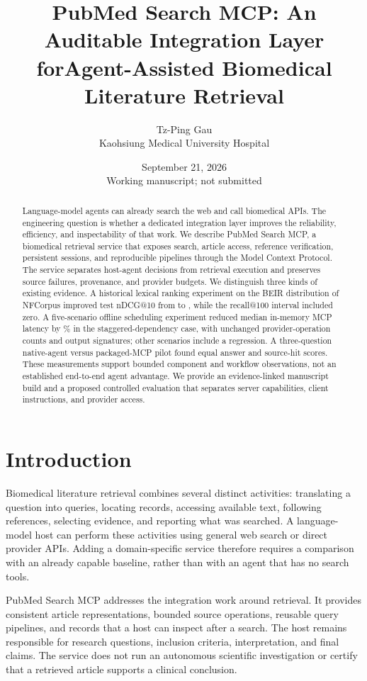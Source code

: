 \documentclass[11pt]{article}
\title{PubMed Search MCP: An Auditable Integration Layer for\newline Agent-Assisted Biomedical Literature Retrieval}
\author{Tz-Ping Gau\\Kaohsiung Medical University Hospital}
\date{September 21, 2026\\\small Working manuscript; not submitted}
\begin{document}
\maketitle
\begin{abstract}
Language-model agents can already search the web and call biomedical APIs. The
engineering question is whether a dedicated integration layer improves the
reliability, efficiency, and inspectability of that work. We describe PubMed
Search MCP, a biomedical retrieval service that exposes search, article access,
reference verification, persistent sessions, and reproducible pipelines through
the Model Context Protocol. The service separates host-agent decisions from
retrieval execution and preserves source failures, provenance, and provider
budgets. We distinguish three kinds of existing evidence. A historical lexical
ranking experiment on the BEIR distribution of NFCorpus improved test nDCG@10
from \NdcgBefore{} to \NdcgAfter{}, while the recall@100 interval included zero.
A five-scenario offline scheduling experiment reduced median in-memory MCP
latency by \StaggeredReduction\% in the staggered-dependency case, with unchanged
provider-operation counts and output signatures; other scenarios include a
regression. A three-question native-agent versus packaged-MCP pilot found equal
answer and source-hit scores. These measurements support bounded component and
workflow observations, not an established end-to-end agent advantage. We provide
an evidence-linked manuscript build and a proposed controlled evaluation that
separates server capabilities, client instructions, and provider access.
\end{abstract}

\section{Introduction}
Biomedical literature retrieval combines several distinct activities: translating
a question into queries, locating records, accessing available text, following
references, selecting evidence, and reporting what was searched. A language-model
host can perform these activities using general web search or direct provider
APIs. Adding a domain-specific service therefore requires a comparison with an
already capable baseline, rather than with an agent that has no search tools.

PubMed Search MCP addresses the integration work around retrieval. It provides
consistent article representations, bounded source operations, reusable query
pipelines, and records that a host can inspect after a search. The host remains
responsible for research questions, inclusion criteria, interpretation, and final
claims. The service does not run an autonomous scientific investigation or certify
that a retrieved article supports a clinical conclusion.
\end{document}
